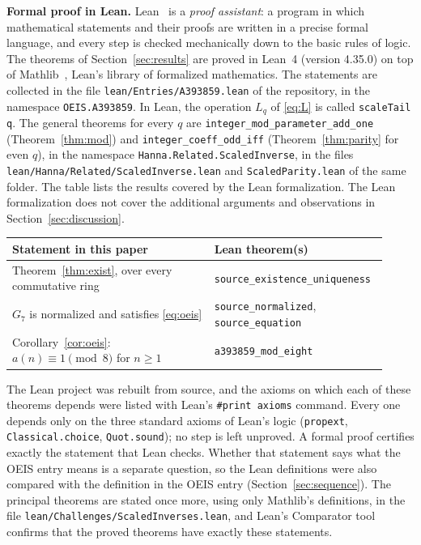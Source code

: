\documentclass[11pt,a4paper]{article}
\theoremstyle{definition}
\theoremstyle{remark}
\newcommand{\para}[1]{\par\medskip\noindent\textbf{#1}\enspace}
\begin{document}
\para{Formal proof in Lean.}
Lean~\cite{lean} is a \emph{proof assistant}: a program in which mathematical statements and their proofs are written
in a precise formal language, and every step is checked mechanically down to the basic rules of logic. The theorems of Section~\ref{sec:results} are proved in Lean~4 (version 4.35.0) on top of
Mathlib~\cite{mathlib}, Lean's library of formalized mathematics. The statements are collected in the file \texttt{lean/Entries/A393859.lean} of the repository,
in the namespace \texttt{OEIS.A393859}. In Lean, the operation $L_q$ of \eqref{eq:L} is called \texttt{scaleTail q}. The general theorems for every $q$ are \texttt{integer\_mod\_parameter\_add\_one} (Theorem~\ref{thm:mod}) and \texttt{integer\_coeff\_odd\_iff} (Theorem~\ref{thm:parity} for even $q$), in the namespace \texttt{Hanna.\allowbreak Related.\allowbreak ScaledInverse}, in the files \texttt{lean/\allowbreak Hanna/\allowbreak Related/\allowbreak ScaledInverse.lean} and \texttt{ScaledParity.lean} of the same folder.
The table lists the results covered by the Lean formalization. The Lean formalization does not cover the additional arguments and observations in Section~\ref{sec:discussion}.
\begin{center}\small\renewcommand{\arraystretch}{1.25}
\begin{tabular}{>{\raggedright\arraybackslash}p{0.52\linewidth}>{\raggedright\arraybackslash}p{0.4\linewidth}}
\toprule
Statement in this paper & Lean theorem(s)\\
\midrule
Theorem~\ref{thm:exist}, over every commutative ring & \texttt{source\_\allowbreak{}existence\_\allowbreak{}uniqueness} \\
$G_{7}$ is normalized and satisfies \eqref{eq:oeis} & \texttt{source\_\allowbreak{}normalized}, \texttt{source\_\allowbreak{}equation} \\
Corollary~\ref{cor:oeis}: $a(n)\equiv1\pmod{8}$ for $n\ge1$ & \texttt{a393859\_\allowbreak{}mod\_\allowbreak{}eight} \\
\bottomrule
\end{tabular}
\end{center}
The Lean project was rebuilt from source, and the axioms on which each of these theorems depends were listed with
Lean's \texttt{\#print axioms} command. Every one depends only on the three standard axioms of Lean's logic
(\texttt{propext}, \texttt{Classical.choice}, \texttt{Quot.sound}); no step is left unproved. A formal proof certifies
exactly the statement that Lean checks. Whether that statement says what the OEIS entry means is a separate question,
so the Lean definitions were also compared with the definition in the OEIS entry
(Section~\ref{sec:sequence}). The principal theorems are stated once more, using only Mathlib's definitions, in the
file \texttt{lean/Challenges/ScaledInverses.lean}, and Lean's Comparator tool confirms that the
proved theorems have exactly these statements.
\end{document}

